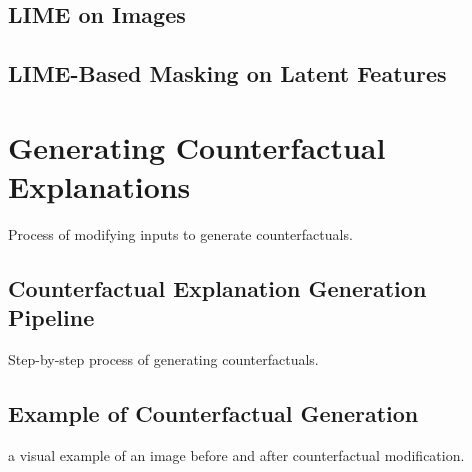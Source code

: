 \subsection{LIME on Images}

\subsection{LIME-Based Masking on Latent Features}




\section{Generating Counterfactual Explanations}
Process of modifying inputs to generate counterfactuals.

\subsection{Counterfactual Explanation Generation Pipeline}
Step-by-step process of generating counterfactuals.


\subsection{Example of Counterfactual Generation}
a visual example of an image before and after counterfactual modification.